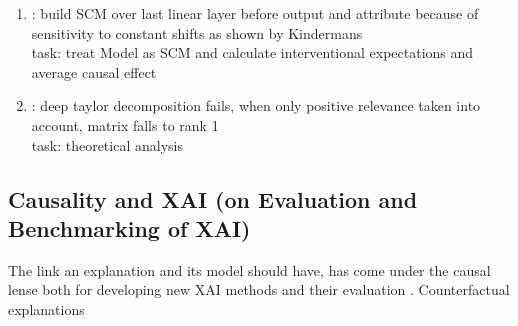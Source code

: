 \begin{enumerate}
      \item \cite{Chattopadhyay2019}: build SCM over last linear layer before output and attribute because of sensitivity to constant shifts as shown by Kindermans
            \\ task: treat Model as SCM and calculate interventional expectations and average causal effect
      \item \cite{Sixt2022}: deep taylor decomposition fails, when only positive relevance taken into account, matrix falls to rank 1 \\ task: theoretical analysis
\end{enumerate}

\subsection{Causality and XAI (on Evaluation and Benchmarking of XAI)}
The link an explanation and its model should have, has come under the causal lense both for developing new XAI methods and their evaluation  . Counterfactual explanations



